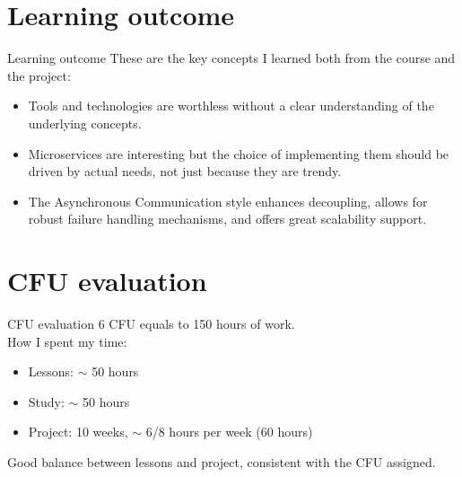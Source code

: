 \documentclass{beamer}
\begin{document}
\section{Learning outcome}
\begin{frame}{Learning outcome}
	These are the key concepts I learned both from the course and the project:
	\begin{itemize}
		\item Tools and technologies are worthless without a clear understanding of the underlying concepts.
		\item Microservices are interesting but the choice of implementing them should be driven by actual needs, not just because they are trendy.
		\item The Asynchronous Communication style enhances decoupling, allows for robust failure handling mechanisms, and offers great scalability support.
	\end{itemize}
\end{frame}

\section{CFU evaluation}
\begin{frame}{CFU evaluation}
	6 CFU equals to 150 hours of work.
	\\
	How I spent my time:
	\begin{itemize}
		\item Lessons: $\sim$ 50 hours
		\item Study: $\sim$ 50 hours
		\item Project: 10 weeks, $\sim$ 6/8 hours per week (60 hours)
	\end{itemize}
	\begin{block}{}
		Good balance between lessons and project, consistent with the CFU assigned.
	\end{block}
\end{frame}
\end{document}
